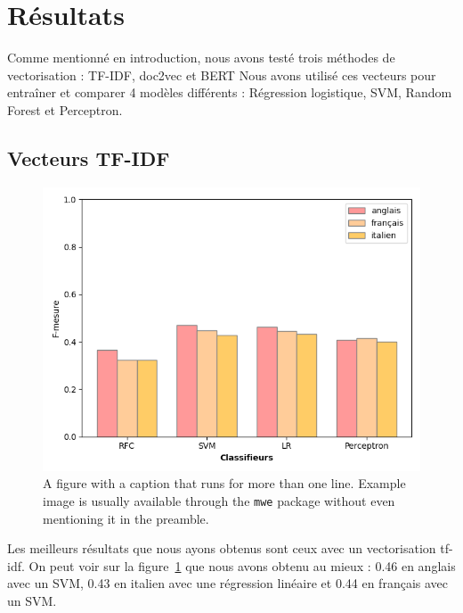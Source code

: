 \section{Résultats}

Comme mentionné en introduction, nous avons testé trois méthodes de vectorisation : TF-IDF, doc2vec et BERT
Nous avons utilisé ces vecteurs pour entraîner et comparer 4 modèles différents : Régression logistique, SVM, Random Forest et Perceptron.

\subsection{Vecteurs TF-IDF}

\begin{figure}[t]
  \includegraphics[width=\columnwidth]{assets/comparaison_metriques_tfidf.png}
  \caption{A figure with a caption that runs for more than one line.
    Example image is usually available through the \texttt{mwe} package
    without even mentioning it in the preamble.}
  \label{fig:tfidf_comparison}
\end{figure}

Les meilleurs résultats que nous ayons obtenus sont ceux avec un vectorisation tf-idf.
On peut voir sur la figure~\ref{fig:tfidf_comparison} que nous avons obtenu au mieux : 0.46 en anglais avec un SVM, 0.43 en italien avec une régression linéaire et 0.44 en français avec un SVM.